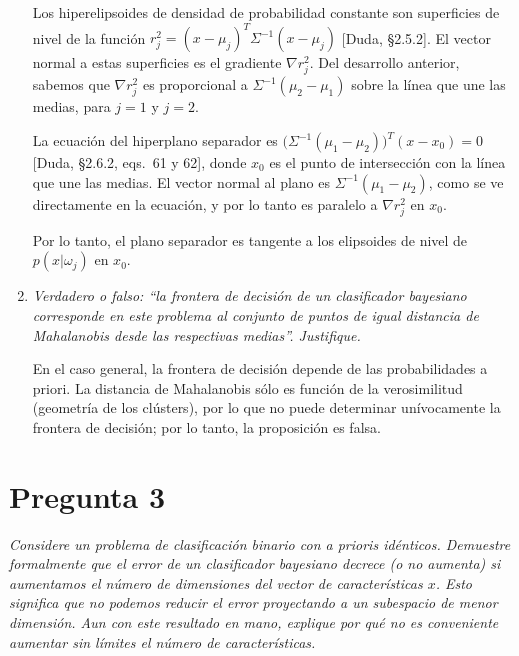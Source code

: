 \documentclass[spanish]{article}
\newcommand{\pregunta}{\textit}
\newcommand{\given}{\vert}
\begin{document}
\begin{enumerate}
        Los hiperelipsoides de densidad de probabilidad constante son superficies de nivel de la
        función $r_j^2 = (x - \mu_j)^T \Sigma^{-1} (x - \mu_j)$ [Duda, \S2.5.2].  El vector normal a
        estas superficies es el gradiente $\nabla r_j^2$.  Del desarrollo anterior, sabemos que $\nabla
        r_j^2$ es proporcional a $\Sigma^{-1}(\mu_2 - \mu_1)$ sobre la línea que une las medias,
        para $j = 1$ y $j = 2$.

        La ecuación del hiperplano separador es $\bigl(\Sigma^{-1}(\mu_1 - \mu_2)\bigr)^T(x - x_0) = 0$
        [Duda, \S2.6.2, eqs.~61 y 62],
        donde $x_0$ es el punto de intersección con la línea que une las medias.
        El vector normal al plano es $\Sigma^{-1}(\mu_1 - \mu_2)$, como se ve directamente en la
        ecuación, y por lo tanto es paralelo a $\nabla r_j^2$ en $x_0$.

        Por lo tanto, el plano separador es tangente a los elipsoides de nivel de
        $p(x\given\omega_j)$ en $x_0$.

    \item \pregunta{Verdadero o falso: ``la frontera de decisión de un clasificador bayesiano
        corresponde en este problema al conjunto de puntos de igual distancia de Mahalanobis desde
        las respectivas medias''.  Justifique.}

        En el caso general, la frontera de decisión depende de las probabilidades a priori.  La
        distancia de Mahalanobis sólo es función de la verosimilitud (geometría de los clústers),
        por lo que no puede determinar unívocamente la frontera de decisión;  por lo tanto, la
        proposición es falsa.
\end{enumerate}

\section*{Pregunta 3}
\pregunta{Considere un problema de clasificación binario con a prioris idénticos. Demuestre
    formalmente que el error de un clasificador bayesiano decrece (o no aumenta) si aumentamos el
    número de dimensiones del vector de características $x$.  Esto significa que no podemos reducir
    el error proyectando a un subespacio de menor dimensión.  Aun con este resultado en mano,
    explique por qué no es conveniente aumentar sin límites el número de características.}
\end{document}
